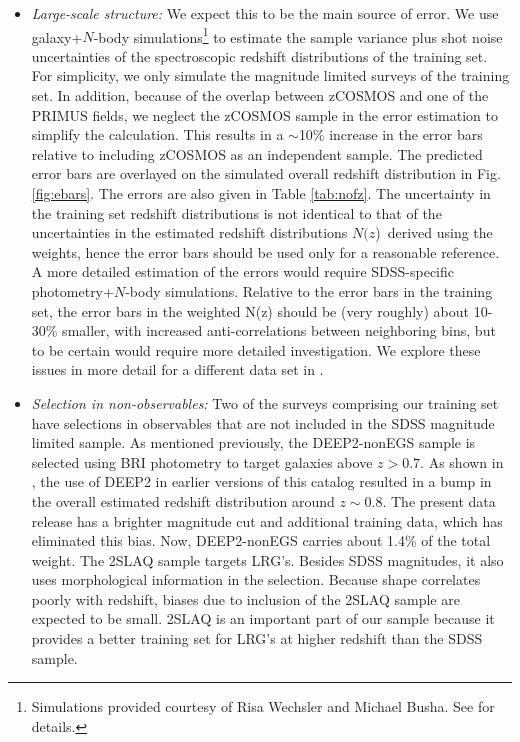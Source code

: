 \documentclass[preprint]{aastex}
\newcommand{\Nofz}{$N(z$)}
\begin{document}
\begin{itemize}

\item {\it Large-scale structure: } We expect this to be the main source of
error.  We use galaxy+$N$-body simulations\footnote{Simulations provided courtesy of Risa Wechsler and
Michael Busha. See \cite{bushasimulations} for details.}
 to estimate the sample variance plus shot
noise uncertainties of the spectroscopic redshift distributions of the training
set.  For simplicity, we only simulate the magnitude limited surveys of the
training set.  In addition, because of the overlap between zCOSMOS and one of
the PRIMUS fields, we neglect the zCOSMOS sample in the error estimation to
simplify the calculation.  This results in a $\sim$10\% increase in the error
bars relative to including zCOSMOS as an independent sample.  The predicted
error bars are overlayed on the simulated overall redshift
distribution in Fig.
\ref{fig:ebars}.  The errors are also given in Table \ref{tab:nofz}. The
uncertainty in the training set redshift distributions is not identical to that
of the uncertainties in the estimated redshift distributions \Nofz\ derived using
the weights, hence the error bars should be used only for a reasonable
reference.  A more detailed estimation of the errors would require SDSS-specific
photometry+$N$-body simulations.  Relative to the error bars in the
training set, the error bars in the weighted N(z) should be (very roughly)
about 10-30\% smaller, with increased anti-correlations between neighboring
bins, but to be certain would require more detailed investigation.
We explore these issues in more detail for a different data set
in \citet{CunhaPhotozLSS11}.


\item {\it Selection in non-observables: } Two of the surveys comprising our
training set have selections in observables that are not included in the SDSS
magnitude limited sample.  As mentioned previously, the DEEP2-nonEGS sample is
selected using BRI photometry to target galaxies above $z>0.7$.  As shown in
\citet{CunhaPhotoz09}, the use of DEEP2 in earlier versions of this catalog
resulted in a bump in the overall estimated redshift distribution around $z\sim
0.8$.  The present data release has a brighter magnitude cut and additional
training data, which has eliminated this bias.  
Now, DEEP2-nonEGS carries about 1.4\% of the total weight.  The 2SLAQ sample targets
LRG's.  Besides SDSS magnitudes, it also uses morphological information in the
selection.  Because shape correlates poorly with redshift, biases due to inclusion of the
2SLAQ sample are expected to be small.  2SLAQ is an important part of our
sample because it provides a better training set for LRG's at higher redshift
than the SDSS sample.


\end{itemize}
\end{document}
